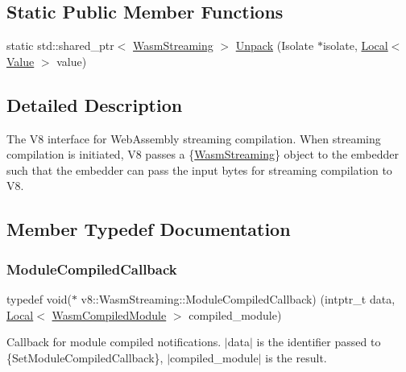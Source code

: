 \subsection*{Static Public Member Functions}
\begin{DoxyCompactItemize}
\item 
static std\+::shared\+\_\+ptr$<$ \mbox{\hyperlink{classv8_1_1WasmStreaming}{Wasm\+Streaming}} $>$ \mbox{\hyperlink{classv8_1_1WasmStreaming_a343acdb301ae8c21b49c177ac28f2b07}{Unpack}} (Isolate $\ast$isolate, \mbox{\hyperlink{classv8_1_1Local}{Local}}$<$ \mbox{\hyperlink{classv8_1_1Value}{Value}} $>$ value)
\end{DoxyCompactItemize}


\subsection{Detailed Description}
The V8 interface for Web\+Assembly streaming compilation. When streaming compilation is initiated, V8 passes a \{\mbox{\hyperlink{classv8_1_1WasmStreaming}{Wasm\+Streaming}}\} object to the embedder such that the embedder can pass the input bytes for streaming compilation to V8. 

\subsection{Member Typedef Documentation}
\mbox{\label{classv8_1_1WasmStreaming_a2e8af849348cbd9fe9c3940ab010917d}} 
\subsubsection{\texorpdfstring{Module\+Compiled\+Callback}{ModuleCompiledCallback}}
{\footnotesize\ttfamily typedef void($\ast$ v8\+::\+Wasm\+Streaming\+::\+Module\+Compiled\+Callback) (intptr\+\_\+t data, \mbox{\hyperlink{classv8_1_1Local}{Local}}$<$ \mbox{\hyperlink{classv8_1_1WasmCompiledModule}{Wasm\+Compiled\+Module}} $>$ compiled\+\_\+module)}

Callback for module compiled notifications. $\vert$data$\vert$ is the identifier passed to \{Set\+Module\+Compiled\+Callback\}, $\vert$compiled\+\_\+module$\vert$ is the result. 

